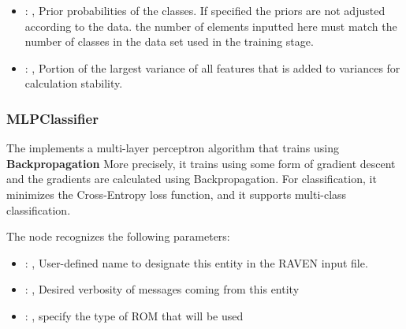 \begin{itemize}
    \item {}: , 
      Prior probabilities of the classes. If specified the priors are
      not adjusted according to the data. \nb the number of elements inputted here must
      match the number of classes in the data set used in the training stage.

    \item {}: , 
      Portion of the largest variance of all features that is added to variances for
      calculation stability.
  \end{itemize}


\subsubsection{MLPClassifier}
  The  implements a multi-layer perceptron algorithm that trains using
  \textbf{Backpropagation}                             More precisely, it trains using some form of
  gradient descent and the gradients are calculated using Backpropagation.
  For classification, it minimizes the Cross-Entropy loss function, and it supports multi-class
  classification.                             

  The  node recognizes the following parameters:
    \begin{itemize}
      \item {}: , 
        User-defined name to designate this entity in the RAVEN input file.
      \item {}: , 
        Desired verbosity of messages coming from this entity
      \item {}: , 
        specify the type of ROM that will be used
  \end{itemize}


